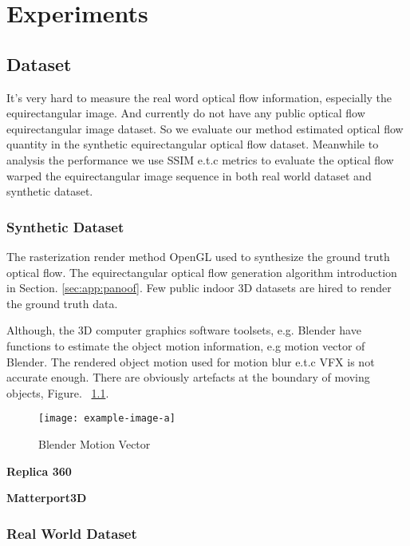 \chapter{Experiments}\label{sec:exp}


\section{Dataset}\label{sec:exp:data}

It's very hard to measure the real word optical flow information, especially the equirectangular image. 
And currently do not have any public optical flow equirectangular image dataset.
So we evaluate our method estimated optical flow quantity in the synthetic equirectangular optical flow dataset.
Meanwhile to analysis the performance we use SSIM e.t.c metrics to evaluate the optical flow warped the equirectangular image sequence in both real world dataset and synthetic dataset.


\subsection{Synthetic Dataset}\label{sec:exp:data:syn}

The rasterization render method OpenGL used to synthesize the ground truth optical flow.
The equirectangular optical flow generation algorithm introduction in Section. \ref{sec:app:panoof}.
Few public indoor 3D datasets are hired to render the ground truth data.

Although, the 3D computer graphics software toolsets, e.g. Blender have functions to estimate the object motion information, e.g motion vector of Blender. 
The rendered object motion used for motion blur e.t.c VFX is not accurate enough. 
There are obviously artefacts at the boundary of moving objects, Figure. ~\ref{fig:exp:blendermv}. 

\begin{figure}[hbt!]
	\centering
	\texttt{[image: example-image-a]}
	\caption{Blender Motion Vector}
	\label{fig:exp:blendermv}
\end{figure}

\textbf{Replica 360} ~\citet{replica19arxiv}



\textbf{Matterport3D} ~\citet{Matterport3D}


\subsection{Real World Dataset}

